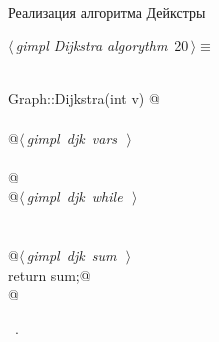 \documentclass[12pt]{article}
\begin{document}
\paragraph{}
Реализация алгоритма Дейкстры \cite{Dijkstra}
\begin{flushleft} \small
\begin{minipage}{\linewidth}\label{scrap36}\raggedright\small
{} $\langle\,${\itshape gimpl Dijkstra algorythm}\nobreak\ {\footnotesize {20}}$\,\rangle\equiv$
\vspace{-1ex}
\begin{list}{}{} \item
\mbox{}\verb@@\\
\mbox{}\verb@double Graph::Dijkstra(int v) {@\\
\mbox{}\verb@@\\
\mbox{}\verb@    @\hbox{$\langle\,${\itshape gimpl djk vars}\nobreak\ {\footnotesize {}}$\,\rangle$}\verb@@\\
\mbox{}\verb@@\\
\mbox{}\verb@    @\\
\mbox{}\verb@    @\hbox{$\langle\,${\itshape gimpl djk while}\nobreak\ {\footnotesize {}}$\,\rangle$}\verb@@\\
\mbox{}\verb@@\\
\mbox{}\verb@@\\
\mbox{}\verb@    @\hbox{$\langle\,${\itshape gimpl djk sum}\nobreak\ {\footnotesize {}}$\,\rangle$}\verb@@\\
\mbox{}\verb@    return sum;@\\
\mbox{}\verb@}@\\
\mbox{}\verb@@{\NWsep}
\end{list}
\vspace{-1.5ex}
\footnotesize
\begin{list}{}{\setlength{\itemsep}{-\parsep}\setlength{\itemindent}{-\leftmargin}}
\item \NWtxtMacroRefIn\ .

\item{}
\end{list}
\end{minipage}\vspace{4ex}
\end{flushleft}
\end{document}
